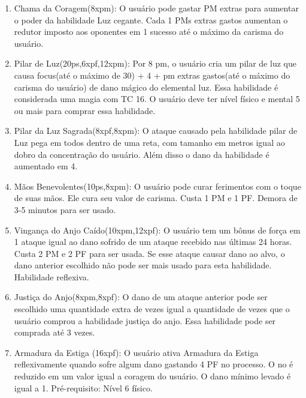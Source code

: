 \begin{enumerate}
 	\item Chama da Coragem(8xpm): O usuário pode gastar PM extras para aumentar o poder da habilidade Luz cegante. Cada 1 PMs extras gastos aumentan o redutor imposto aos oponentes em 1 sucesso até o máximo da carisma do usuário.
 
 	\item Pilar de Luz(20ps,6xpf,12xpm): Por 8 pm, o usuário cria um pilar de luz que causa focus(até o máximo de 30) + 4 + pm extras gastos(até o máximo do carisma do usuário) de dano mágico do elemental luz. Essa habilidade é considerada uma magia com TC 16. O usuário deve ter nível físico e mental 5 ou mais para comprar essa habilidade.
 	 	
 	\item Pilar da Luz Sagrada(8xpf,8xpm): O ataque causado pela habilidade pilar de Luz pega em todos dentro de uma reta, com tamanho em metros igual ao dobro da concentração do usuário. Além disso o dano da habilidade é aumentado em 4.
 
 	\item Mãos Benevolentes(10ps,8xpm): O usuário pode curar ferimentos com o toque de suas mãos. Ele cura seu valor de carisma. Custa 1 PM e 1 PF. Demora de 3-5 minutos para ser usado. 
 	
 	\item Vingança do Anjo Caído(10xpm,12xpf): O usuário tem um bônus de força em 1 ataque igual ao dano sofrido de um ataque recebido nas últimas 24 horas. Custa 2 PM e 2 PF para ser usada. Se esse ataque causar dano ao alvo, o dano anterior escolhido não pode ser mais usado para esta habilidade. Habilidade reflexiva. 
 	
 
 \item Justiça do Anjo(8xpm,8xpf): O dano de um ataque anterior pode ser escolhido uma quantidade extra de vezes igual a quantidade de vezes que o usuário comprou a habilidade justiça do anjo. Essa habilidade pode ser comprada até 3 vezes.

	\item Armadura da Estiga (16xpf): O usuário ativa Armadura da Estiga reflexivamente quando sofre algum dano gastando 4 PF no processo. O no é reduzido em um valor igual a coragem do usuário. O dano mínimo levado é igual a 1. Pré-requisito: Nível 6 físico. 


\end{enumerate}
